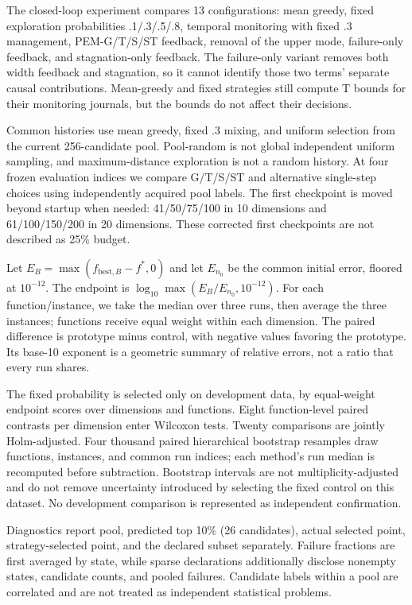 \documentclass[11pt,a4paper]{article}
\begin{document}
The closed-loop experiment compares 13 configurations: mean greedy,
fixed exploration probabilities .1/.3/.5/.8, temporal monitoring with
fixed .3 management, PEM-G/T/S/ST feedback, removal of the upper mode,
failure-only feedback, and stagnation-only feedback. The failure-only
variant removes both width feedback and stagnation, so it cannot
identify those two terms' separate causal contributions. Mean-greedy and
fixed strategies still compute T bounds for their monitoring journals,
but the bounds do not affect their decisions.

Common histories use mean greedy, fixed .3 mixing, and uniform selection
from the current 256-candidate pool. Pool-random is not global
independent uniform sampling, and maximum-distance exploration is not a
random history. At four frozen evaluation indices we compare G/T/S/ST
and alternative single-step choices using independently acquired pool
labels. The first checkpoint is moved beyond startup when needed:
41/50/75/100 in 10 dimensions and 61/100/150/200 in 20 dimensions. These
corrected first checkpoints are not described as 25\% budget.

Let \(E_B=\max(f_{\mathrm{best},B}-f^*,0)\) and let \(E_{n_0}\) be the
common initial error, floored at \(10^{-12}\). The endpoint is
\(\log_{10}\max(E_B/E_{n_0},10^{-12})\). For each function/instance, we
take the median over three runs, then average the three instances;
functions receive equal weight within each dimension. The paired
difference is prototype minus control, with negative values favoring the
prototype. Its base-10 exponent is a geometric summary of relative
errors, not a ratio that every run shares.

The fixed probability is selected only on development data, by
equal-weight endpoint scores over dimensions and functions. Eight
function-level paired contrasts per dimension enter Wilcoxon tests.
Twenty comparisons are jointly Holm-adjusted. Four thousand paired
hierarchical bootstrap resamples draw functions, instances, and common
run indices; each method's run median is recomputed before subtraction.
Bootstrap intervals are not multiplicity-adjusted and do not remove
uncertainty introduced by selecting the fixed control on this dataset.
No development comparison is represented as independent confirmation.

Diagnostics report pool, predicted top 10\% (26 candidates), actual
selected point, strategy-selected point, and the declared subset
separately. Failure fractions are first averaged by state, while sparse
declarations additionally disclose nonempty states, candidate counts,
and pooled failures. Candidate labels within a pool are correlated and
are not treated as independent statistical problems.
\end{document}
